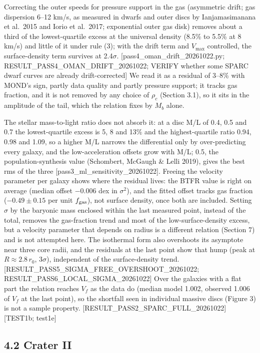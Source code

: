 \documentclass[
  10pt,
]{article}
\begin{document}
Correcting the outer speeds for pressure support in the gas (asymmetric drift; gas dispersion 6--12 km/s, as measured in dwarfs and outer discs by Ianjamasimanana et al.~2015 and Iorio et al.~2017; exponential outer gas disk) removes about a third of the lowest-quartile excess at the universal density (8.5\% to 5.5\% at 8 km/s) and little of it under rule (3); with the drift term and $V_{\max}$ controlled, the surface-density term survives at 2.4$\sigma$. {[}pass4\_oman\_drift\_20261022.py; RESULT\_PASS4\_OMAN\_DRIFT\_20261022; VERIFY whether some SPARC dwarf curves are already drift-corrected{]} We read it as a residual of 3--8\% with MOND's sign, partly data quality and partly pressure support; it tracks gas fraction, and it is not removed by any choice of $\rho_c$ (Section 3.1), so it sits in the amplitude of the tail, which the relation fixes by $M_b$ alone.

The stellar mass-to-light ratio does not absorb it: at a disc M/L of 0.4, 0.5 and 0.7 the lowest-quartile excess is 5, 8 and 13\% and the highest-quartile ratio 0.94, 0.98 and 1.09, so a higher M/L narrows the differential only by over-predicting every galaxy, and the low-acceleration offsets grow with M/L; 0.5, the population-synthesis value (Schombert, McGaugh \& Lelli 2019), gives the best rms of the three {[}pass3\_ml\_sensitivity\_20261022{]}. Freeing the velocity parameter per galaxy shows where the residual lives: the BTFR value is right on average (median offset $-0.006$ dex in $\sigma^2$), and the fitted offset tracks gas fraction ($-0.49\pm0.15$ per unit $f_{\rm gas}$), not surface density, once both are included. Setting $\sigma$ by the baryonic mass enclosed within the last measured point, instead of the total, removes the gas-fraction trend and most of the low-surface-density excess, but a velocity parameter that depends on radius is a different relation (Section 7) and is not attempted here. The isothermal form also overshoots its asymptote near three core radii, and the residuals at the last point show that hump (peak at $R\approx2.8\,r_0$, $3\sigma$), independent of the surface-density trend. {[}RESULT\_PASS5\_SIGMA\_FREE\_OVERSHOOT\_20261022; RESULT\_PASS6\_LOCAL\_SIGMA\_20261022{]} Over the galaxies with a flat part the relation reaches $V_f$ as the data do (median model 1.002, observed 1.006 of $V_f$ at the last point), so the shortfall seen in individual massive discs (Figure 3) is not a sample property. {[}RESULT\_PASS2\_SPARC\_FULL\_20261022{]} {[}TEST1b; test1e{]}


\subsection{4.2 Crater II}
\end{document}
